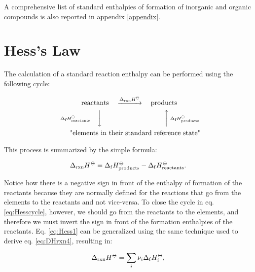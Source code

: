 \documentclass[
  9pt,
]{extbook}
\theoremstyle{definition}
\theoremstyle{definition}
\theoremstyle{definition}
\theoremstyle{definition}
\theoremstyle{remark}
\begin{document}
A comprehensive list of standard enthalpies of formation of inorganic and organic compounds is also reported in appendix \ref{appendix}.

\section{Hess's Law}\label{hessslaw}

The calculation of a standard reaction enthalpy can be performed using the following cycle:

\begin{equation}
\begin{aligned}
 \text{reactants} & \quad \xrightarrow{\Delta_{\text{rxn}} H^{-\kern-6pt{\ominus}\kern-6pt-}} \quad \text{products} \\
\scriptstyle{-\Delta_{\text{f}} H_{\text{reactants}}^{-\kern-6pt{\ominus}\kern-6pt-}} \quad \bigg\downarrow \quad & \qquad \qquad \qquad \qquad \scriptstyle{\bigg\uparrow  \; \Delta_{\text{f}} H_{\text{products}}^{-\kern-6pt{\ominus}\kern-6pt-}} \\
 \text{"elements in } & \text{their standard reference state"}
\end{aligned}
\label{eq:Hesscycle}
\end{equation}

This process is summarized by the simple formula:

\begin{equation}
  \Delta_{\text{rxn}} H^{-\kern-6pt{\ominus}\kern-6pt-}= \Delta_{\mathrm{f}} H_{\text{products}}^{-\kern-6pt{\ominus}\kern-6pt-}- \Delta_{\mathrm{f}} H_{\text{reactants}}^{-\kern-6pt{\ominus}\kern-6pt-}.
  \label{eq:Hess1}
\end{equation}

Notice how there is a negative sign in front of the enthalpy of formation of the reactants because they are normally defined for the reactions that go from the elements to the reactants and not vice-versa. To close the cycle in eq. \eqref{eq:Hesscycle}, however, we should go from the reactants to the elements, and therefore we must invert the sign in front of the formation enthalpies of the reactants. Eq. \eqref{eq:Hess1} can be generalized using the same technique used to derive eq. \eqref{eq:DHrxn4}, resulting in:

\begin{equation}
  \Delta_{\text{rxn}} H^{-\kern-6pt{\ominus}\kern-6pt-}= \sum_i \nu_i \Delta_{\mathrm{f}} H_i^{-\kern-6pt{\ominus}\kern-6pt-},
  \label{eq:Hess}
\end{equation}
\end{document}
